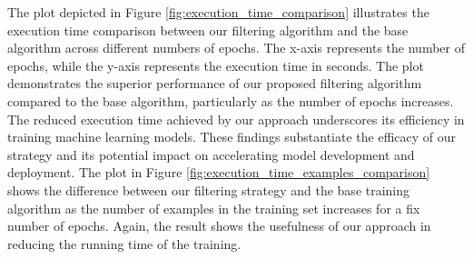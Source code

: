 \documentclass{article}
\begin{document}
The plot depicted in Figure \ref{fig:execution_time_comparison} illustrates the execution time comparison between our filtering algorithm and the base algorithm across different numbers of epochs. The x-axis represents the number of epochs, while the y-axis represents the execution time in seconds. The plot demonstrates the superior performance of our proposed filtering algorithm compared to the base algorithm, particularly as the number of epochs increases. The reduced execution time achieved by our approach underscores its efficiency in training machine learning models. These findings substantiate the efficacy of our strategy and its potential impact on accelerating model development and deployment.
The plot in Figure \ref{fig:execution_time_examples_comparison} shows the difference between our filtering strategy and the base training algorithm as the number of examples in the training set increases for a fix number of epochs. Again, the result shows the usefulness of our approach in reducing the running time of the training. 
\end{document}
